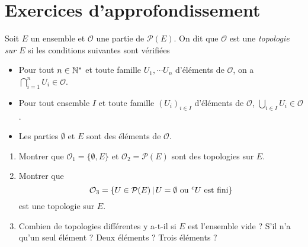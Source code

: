 \section{Exercices d'approfondissement}

\begin{exercice}[Topologies]
Soit $E$ un ensemble et  $\mathcal O$ une partie de $\mathcal P(E)$. On dit que $\mathcal O$ est une \emph{topologie sur $E$} si les conditions suivantes sont vérifiées
\begin{itemize}
\item Pour tout $n\in \mathbb{N}^*$ et toute famille $U_1, \cdots U_n$ d'éléments de $\mathcal O$, on a $\bigcap_{i=1}^n U_i\in \mathcal O$.
\item Pour tout ensemble $I$ et toute famille $(U_i)_{i\in I}$ d'éléments de $\mathcal O$, $\bigcup_{i\in I}U_i \in \mathcal O$.
\item Les parties $\emptyset$ et $E$ sont des éléments de $\mathcal O$.
\end{itemize}

\begin{enumerate}
\item Montrer que $\mathcal O_1=\{\emptyset, E\}$ et $\mathcal O_2=\mathcal P(E)$ sont des topologies sur $E$.
\item Montrer que 
\[ \mathcal O_3 = \ensemble{U\in \mathcal P(E)}{U=\emptyset \text{ ou }{}^cU\text{ est fini}}
\]
est une topologie sur $E$.
\item Combien de topologies différentes y a-t-il si $E$ est l'ensemble vide ? S'il n'a qu'un seul élément ? Deux éléments ? Trois éléments ?
\end{enumerate}
\end{exercice}


